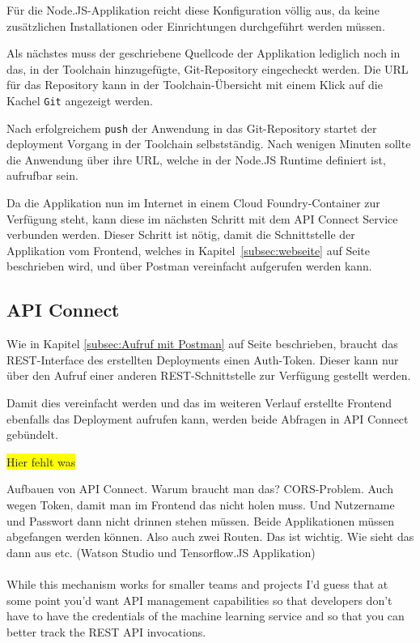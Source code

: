 Für die Node.JS-Applikation reicht diese Konfiguration völlig aus, da keine zusätzlichen Installationen oder Einrichtungen
durchgeführt werden müssen.

Als nächstes muss der geschriebene Quellcode der Applikation lediglich noch in das, in der Toolchain hinzugefügte,
Git-Repository eingecheckt werden. Die URL für das Repository kann in der Toolchain-Übersicht mit einem Klick auf die
Kachel \texttt{Git} angezeigt werden.

Nach erfolgreichem \texttt{push} der Anwendung in das Git-Repository startet der deployment Vorgang in der Toolchain
selbstständig. Nach wenigen Minuten sollte die Anwendung über ihre URL, welche in der Node.JS Runtime definiert ist,
aufrufbar sein.

Da die Applikation nun im Internet in einem Cloud Foundry-Container zur Verfügung steht, kann diese im nächsten Schritt
mit dem API Connect Service verbunden werden. Dieser Schritt ist nötig, damit die Schnittstelle der Applikation vom
Frontend, welches in Kapitel~\ref{subsec:webseite} auf Seite~\pageref{subsec:webseite} beschrieben wird, und über Postman
vereinfacht aufgerufen werden kann.

\subsection{API Connect}
Wie in Kapitel \ref{subsec:Aufruf mit Postman} auf Seite \pageref{subsec:Testen mit Postman} beschrieben, braucht das
REST-Interface des erstellten Deployments einen Auth-Token. Dieser kann nur über den Aufruf einer anderen
REST-Schnittstelle zur Verfügung gestellt werden.

Damit dies vereinfacht werden und das im weiteren Verlauf erstellte Frontend ebenfalls das Deployment aufrufen kann,
werden beide Abfragen in API Connect gebündelt.

\colorbox{yellow}{Hier fehlt was}

Aufbauen von API Connect. Warum braucht man das? CORS-Problem. Auch wegen Token, damit man im Frontend das nicht
holen muss. Und Nutzername und Passwort dann nicht drinnen stehen müssen. Beide Applikationen müssen abgefangen werden
können. Also auch zwei Routen. Das ist wichtig. Wie sieht das dann aus etc. (Watson Studio und Tensorflow.JS Applikation)
\\ \\
While this mechanism works for smaller teams and projects I’d guess that at some point you’d want API management
capabilities so that developers don’t have to have the credentials of the machine learning service and so that you can
better track the REST API invocations.